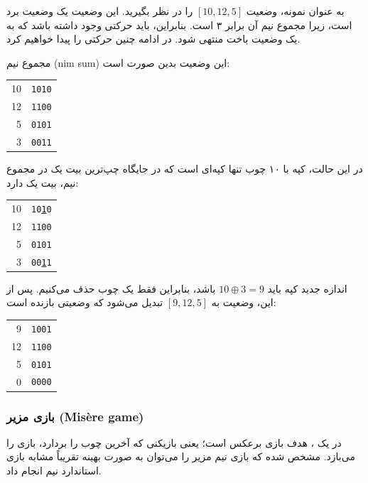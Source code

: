 به عنوان نمونه، وضعیت $[10,12,5]$ را در نظر بگیرید.
این وضعیت یک وضعیت برد است،
زیرا مجموع نیم آن برابر ۳ است.
بنابراین، باید حرکتی وجود داشته باشد که
به یک وضعیت باخت منتهی شود.
در ادامه چنین حرکتی را پیدا خواهیم کرد.

مجموع نیم (nim sum) این وضعیت بدین صورت است:

\begin{center}
\begin{tabular}{r|r}
10 & \texttt{1010} \\
12 & \texttt{1100} \\
5 & \texttt{0101} \\
\hline
3 & \texttt{0011} \\
\end{tabular}
\end{center}

در این حالت، کپه با ۱۰ چوب تنها کپه‌ای است که در جایگاه چپ‌ترین بیت یک در مجموع نیم، بیت یک دارد:

\begin{center}
\begin{tabular}{r|r}
10 & \texttt{10\underline{1}0} \\
12 & \texttt{1100} \\
5 & \texttt{0101} \\
\hline
3 & \texttt{00\underline{1}1} \\
\end{tabular}
\end{center}

اندازه جدید کپه باید $10 \oplus 3 = 9$ باشد، بنابراین فقط یک چوب حذف می‌کنیم. پس از این، وضعیت به $[9,12,5]$ تبدیل می‌شود که وضعیتی بازنده است:

\begin{center}
\begin{tabular}{r|r}
9 & \texttt{1001} \\
12 & \texttt{1100} \\
5 & \texttt{0101} \\
\hline
0 & \texttt{0000} \\
\end{tabular}
\end{center}

\subsubsection{بازی مزیر (Misère game)}


در یک ، هدف بازی برعکس است؛ یعنی بازیکنی که آخرین چوب را بردارد، بازی را می‌بازد. مشخص شده که بازی نیم مزیر را می‌توان به صورت بهینه تقریباً مشابه بازی استاندارد نیم انجام داد.

